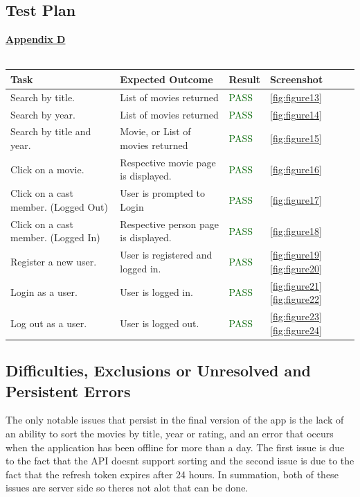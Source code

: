 \documentclass[12pt,a4paper]{article}
\begin{document}
		\subsection{Test Plan}
			\hyperref[subsec:appendixD]{\textbf{Appendix D}}\\
			\\
			\begin{tabular}{|p{}|p{}|p{}|p{}|}
				\hline
				\rowcolor{gray!30}
				\textbf{Task} & 
				\textbf{Expected Outcome} & 
				\textbf{Result} & 
				\textbf{Screenshot} \\
				\hline
				Search by title. & 
				List of movies returned & 
				\textcolor{darkgreen}{PASS} & 
				\cref{fig:figure13} \\
				\hline
				Search by year. & 
				List of movies returned & 
				\textcolor{darkgreen}{PASS} & 
				\cref{fig:figure14} \\
				\hline
				Search by title and year. &
				Movie, or List of movies returned & 
				\textcolor{darkgreen}{PASS} &
				\cref{fig:figure15} \\
				\hline
				Click on a movie. &
				Respective movie page is displayed. &
				\textcolor{darkgreen}{PASS} &
				\cref{fig:figure16} \\
				\hline
				Click on a cast member.
				(Logged Out) &
				User is prompted to Login &
				\textcolor{darkgreen}{PASS} &
				\cref{fig:figure17} \\
				\hline
				Click on a cast member.
				(Logged In) &
				Respective person page is displayed. &
				\textcolor{darkgreen}{PASS} &
				\cref{fig:figure18} \\
				\hline
				Register a new user. &
				User is registered and logged in. &
				\textcolor{darkgreen}{PASS} &
				\cref{fig:figure19} 
				\cref{fig:figure20} \\
				\hline
				Login as a user. &
				User is logged in. &
				\textcolor{darkgreen}{PASS} &
				\cref{fig:figure21}
				\cref{fig:figure22} \\
				\hline
				Log out as a user. &
				User is logged out. &
				\textcolor{darkgreen}{PASS} &
				\cref{fig:figure23} 
				\cref{fig:figure24} \\
				\hline
			\end{tabular}
	
		\subsection{Difficulties, Exclusions or Unresolved and Persistent Errors}
			The only notable issues that persist in the final version of the app is the lack of 
			an ability to sort the movies by title, year or rating, and an error that occurs when the 
			application has been offline for more than a day. The first issue is due to the fact that 
			the API doesnt support sorting and the second issue is due to the fact that the refresh 
			token expires after 24 hours. In summation, both of these issues are server side so theres 
			not alot that can be done.\\
	
\end{document}
